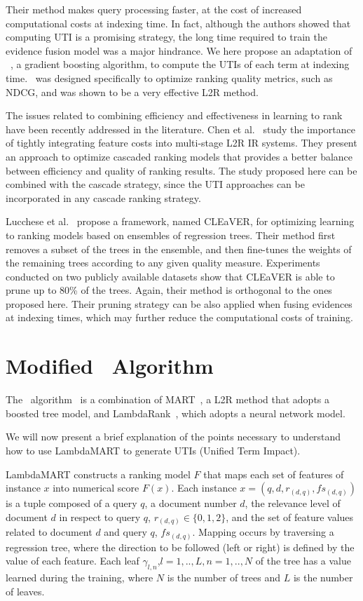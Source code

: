 \documentclass[preprint,review,10pt,3p]{elsarticle}
\begin{document}
Their method makes query processing faster, at the cost of increased computational costs at indexing time. In fact, although the authors showed that computing UTI is a promising strategy, the long time required to train the evidence fusion model was a major hindrance. We here propose an adaptation of \lambdamart~\cite{wu2010lambdamart}, a gradient boosting algorithm, to compute the UTIs of each term at indexing time. \lambdamart\ was designed specifically to optimize ranking quality metrics, such as NDCG, and was shown to be a very effective L2R method. 

The issues related to combining efficiency and effectiveness in learning to rank have been recently addressed in the literature. Chen et al.~\cite{Chen2017} study  the importance of tightly integrating feature costs into multi-stage L2R IR systems. They present an approach to optimize cascaded ranking models that provides a better balance between efficiency and quality of ranking results.  The study proposed here can be combined with the cascade strategy, since the UTI approaches can be incorporated in any cascade ranking strategy.

Lucchese et al.~\cite{Lucchese2016}  propose a  framework, named CLEaVER, for optimizing learning to ranking models based on ensembles of regression trees.  Their method first removes a subset of the trees in the ensemble, and then fine-tunes the weights of the remaining trees according to any given quality measure. Experiments conducted on two publicly available  datasets show that CLEaVER is able to prune up to 80\% of the trees. Again, their method is orthogonal to the ones proposed here. Their pruning strategy can be also applied when fusing evidences at indexing times, which may further reduce the computational costs of training. 

\section{Modified \lambdamart\ Algorithm}
\label{lambda}
\newcommand{\lamdamart}{LambdaMART}

The \lambdamart\ algorithm~\cite{wu2010lambdamart} is a combination of
MART~\cite{Jerome2001}, a L2R method that adopts a boosted tree model, and LambdaRank~\cite{Burges2006},
which adopts a neural network model. 

We will now present a brief explanation of the points necessary to understand
how to use LambdaMART to generate UTIs (Unified Term Impact).

LambdaMART constructs a ranking model $F$ that maps
each set of features of instance $x$ into numerical score $F(x)$. Each instance $x=(q,d,r_{(d,q)},fs_{(d,q)})$ is a tuple composed of a query $q$, a document number $d$, the relevance level of document $d$ in respect to query $q$, $r_{(d,q)} \in \{0,1,2\}$, and the set of feature values related to document $d$ and query $q$, $fs_{(d,q)}$.   Mapping occurs by traversing a regression tree, where the direction to be followed (left or right) is defined by the value of each feature. Each leaf $\gamma_{l,n}$,$l=1,..,L, n=1,..,N$ of the tree has a value learned during the training, where $N$ is the number of trees and $L$ is the number of leaves.
\end{document}
